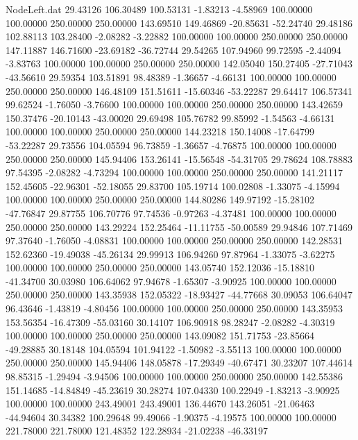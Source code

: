 \begin{filecontents}{NodeLeft.dat}
  29.43126  106.30489  100.53131    -1.83213   -4.58969  100.00000  100.00000  250.00000  250.00000  143.69510  149.46869  -20.85631  -52.24740
  29.48186  102.88113  103.28400    -2.08282   -3.22882  100.00000  100.00000  250.00000  250.00000  147.11887  146.71600  -23.69182  -36.72744
  29.54265  107.94960   99.72595    -2.44094   -3.83763  100.00000  100.00000  250.00000  250.00000  142.05040  150.27405  -27.71043  -43.56610
  29.59354  103.51891   98.48389    -1.36657   -4.66131  100.00000  100.00000  250.00000  250.00000  146.48109  151.51611  -15.60346  -53.22287
  29.64417  106.57341   99.62524    -1.76050   -3.76600  100.00000  100.00000  250.00000  250.00000  143.42659  150.37476  -20.10143  -43.00020
  29.69498  105.76782   99.85992    -1.54563   -4.66131  100.00000  100.00000  250.00000  250.00000  144.23218  150.14008  -17.64799  -53.22287
  29.73556  104.05594   96.73859    -1.36657   -4.76875  100.00000  100.00000  250.00000  250.00000  145.94406  153.26141  -15.56548  -54.31705
  29.78624  108.78883   97.54395    -2.08282   -4.73294  100.00000  100.00000  250.00000  250.00000  141.21117  152.45605  -22.96301  -52.18055
  29.83700  105.19714  100.02808    -1.33075   -4.15994  100.00000  100.00000  250.00000  250.00000  144.80286  149.97192  -15.28102  -47.76847
  29.87755  106.70776   97.74536    -0.97263   -4.37481  100.00000  100.00000  250.00000  250.00000  143.29224  152.25464  -11.11755  -50.00589
  29.94846  107.71469   97.37640    -1.76050   -4.08831  100.00000  100.00000  250.00000  250.00000  142.28531  152.62360  -19.49038  -45.26134
  29.99913  106.94260   97.87964    -1.33075   -3.62275  100.00000  100.00000  250.00000  250.00000  143.05740  152.12036  -15.18810  -41.34700
  30.03980  106.64062   97.94678    -1.65307   -3.90925  100.00000  100.00000  250.00000  250.00000  143.35938  152.05322  -18.93427  -44.77668
  30.09053  106.64047   96.43646    -1.43819   -4.80456  100.00000  100.00000  250.00000  250.00000  143.35953  153.56354  -16.47309  -55.03160
  30.14107  106.90918   98.28247    -2.08282   -4.30319  100.00000  100.00000  250.00000  250.00000  143.09082  151.71753  -23.85664  -49.28885
  30.18148  104.05594  101.94122    -1.50982   -3.55113  100.00000  100.00000  250.00000  250.00000  145.94406  148.05878  -17.29349  -40.67471
  30.23207  107.44614   98.85315    -1.29494   -3.94506  100.00000  100.00000  250.00000  250.00000  142.55386  151.14685  -14.84849  -45.23619
  30.28274  107.04330  100.22949    -1.83213   -3.90925  100.00000  100.00000  243.49001  243.49001  136.44670  143.26051  -21.06463  -44.94604
  30.34382  100.29648   99.49066    -1.90375   -4.19575  100.00000  100.00000  221.78000  221.78000  121.48352  122.28934  -21.02238  -46.33197

\end{filecontents}
